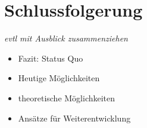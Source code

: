 \documentclass[12pt,twoside]{article}
\theoremstyle{plain}
\theoremstyle{definition}
\theoremstyle{remark}
\begin{document}
\section{Schlussfolgerung}
\label{sec:concl}
\textit{evtl mit Ausblick zusammenziehen}\\
\begin{itemize}
	\item Fazit: Status Quo
	\item Heutige Möglichkeiten
	\item theoretische Möglichkeiten
	\item Ansätze für Weiterentwicklung
\end{itemize}



%
%
\newpage


\nocite{*}
\end{document}
